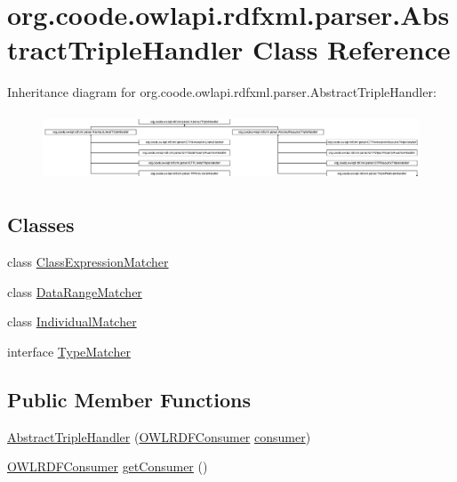 \hypertarget{classorg_1_1coode_1_1owlapi_1_1rdfxml_1_1parser_1_1_abstract_triple_handler}{\section{org.\-coode.\-owlapi.\-rdfxml.\-parser.\-Abstract\-Triple\-Handler Class Reference}
\label{classorg_1_1coode_1_1owlapi_1_1rdfxml_1_1parser_1_1_abstract_triple_handler}
}
Inheritance diagram for org.\-coode.\-owlapi.\-rdfxml.\-parser.\-Abstract\-Triple\-Handler\-:\begin{figure}[H]
\begin{center}
\leavevmode
\includegraphics[height=2.019231cm]{classorg_1_1coode_1_1owlapi_1_1rdfxml_1_1parser_1_1_abstract_triple_handler}
\end{center}
\end{figure}
\subsection*{Classes}
\begin{DoxyCompactItemize}
\item 
class \hyperlink{classorg_1_1coode_1_1owlapi_1_1rdfxml_1_1parser_1_1_abstract_triple_handler_1_1_class_expression_matcher}{Class\-Expression\-Matcher}
\item 
class \hyperlink{classorg_1_1coode_1_1owlapi_1_1rdfxml_1_1parser_1_1_abstract_triple_handler_1_1_data_range_matcher}{Data\-Range\-Matcher}
\item 
class \hyperlink{classorg_1_1coode_1_1owlapi_1_1rdfxml_1_1parser_1_1_abstract_triple_handler_1_1_individual_matcher}{Individual\-Matcher}
\item 
interface \hyperlink{interfaceorg_1_1coode_1_1owlapi_1_1rdfxml_1_1parser_1_1_abstract_triple_handler_1_1_type_matcher}{Type\-Matcher}
\end{DoxyCompactItemize}
\subsection*{Public Member Functions}
\begin{DoxyCompactItemize}
\item 
\hyperlink{classorg_1_1coode_1_1owlapi_1_1rdfxml_1_1parser_1_1_abstract_triple_handler_a8bbe57321d7a26df304f8e77cd9933c3}{Abstract\-Triple\-Handler} (\hyperlink{classorg_1_1coode_1_1owlapi_1_1rdfxml_1_1parser_1_1_o_w_l_r_d_f_consumer}{O\-W\-L\-R\-D\-F\-Consumer} \hyperlink{classorg_1_1coode_1_1owlapi_1_1rdfxml_1_1parser_1_1_abstract_triple_handler_a4ccf4d898ff01eb1cadfa04b23d54e9c}{consumer})
\item 
\hyperlink{classorg_1_1coode_1_1owlapi_1_1rdfxml_1_1parser_1_1_o_w_l_r_d_f_consumer}{O\-W\-L\-R\-D\-F\-Consumer} \hyperlink{classorg_1_1coode_1_1owlapi_1_1rdfxml_1_1parser_1_1_abstract_triple_handler_abcab4d679a26e30cef1a4c25fca03b32}{get\-Consumer} ()
\end{DoxyCompactItemize}
